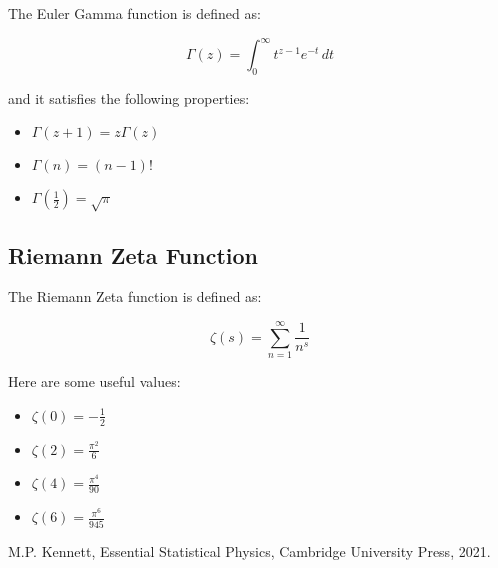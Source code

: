 \documentclass{article}
\begin{document}
The Euler Gamma function is defined as:

\begin{equation}
    \Gamma(z) = \int_{0}^{\infty} t^{z-1} e^{-t} \, dt
\end{equation}

and it satisfies the following properties:

\begin{itemize}
    \item $\Gamma(z+1) = z\Gamma(z)$
    \item $\Gamma(n) = (n-1)!$
    \item $\Gamma\left(\frac{1}{2}\right) = \sqrt{\pi}$
\end{itemize}

\subsection{Riemann Zeta Function}

The Riemann Zeta function is defined as:

\begin{equation}
    \zeta(s) = \sum_{n=1}^{\infty} \frac{1}{n^s}
\end{equation}

Here are some useful values:

\begin{itemize}
    \item $\zeta(0) = -\frac{1}{2}$
    \item $\zeta(2) = \frac{\pi^2}{6}$
    \item $\zeta(4) = \frac{\pi^4}{90}$
    \item $\zeta(6) = \frac{\pi^6}{945}$
\end{itemize}



\newpage

\begin{thebibliography}{9}

    M.P. Kennett,
    Essential Statistical Physics,
    Cambridge University Press,
    2021.



\end{thebibliography}
\end{document}
